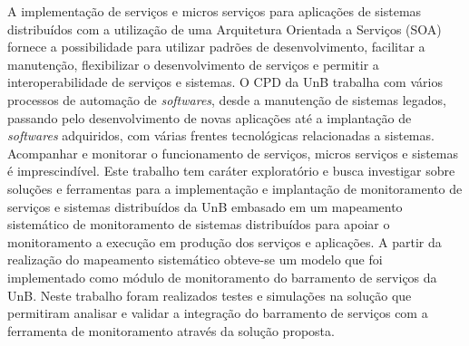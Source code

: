 A implementação de serviços e micros serviços para aplicações de sistemas distribuídos com a utilização de uma Arquitetura Orientada a Serviços (\acrshort{SOA}) fornece a possibilidade para utilizar padrões de desenvolvimento, facilitar a manutenção, flexibilizar o desenvolvimento de serviços e permitir a interoperabilidade de serviços e sistemas. O \acrfull{CPD} da \acrfull{UnB} trabalha com vários processos de automação de \textit{softwares}, desde a manutenção de sistemas legados, passando pelo desenvolvimento de novas aplicações até a implantação de \textit{softwares} adquiridos, com várias frentes tecnológicas relacionadas a sistemas. Acompanhar e monitorar o funcionamento de serviços, micros serviços e sistemas é imprescindível. Este trabalho tem caráter exploratório e busca investigar sobre soluções e ferramentas para a implementação e implantação de monitoramento de serviços e sistemas distribuídos da \acrfull{UnB} embasado em um mapeamento sistemático de monitoramento de sistemas distribuídos para apoiar o monitoramento a execução em produção dos serviços e aplicações. A partir da realização do mapeamento sistemático obteve-se um modelo que foi implementado como módulo de monitoramento do barramento de serviços da \acrfull{UnB}. Neste trabalho foram realizados testes e simulações na solução que permitiram analisar e validar a integração do barramento de serviços com a ferramenta de monitoramento através da solução proposta.